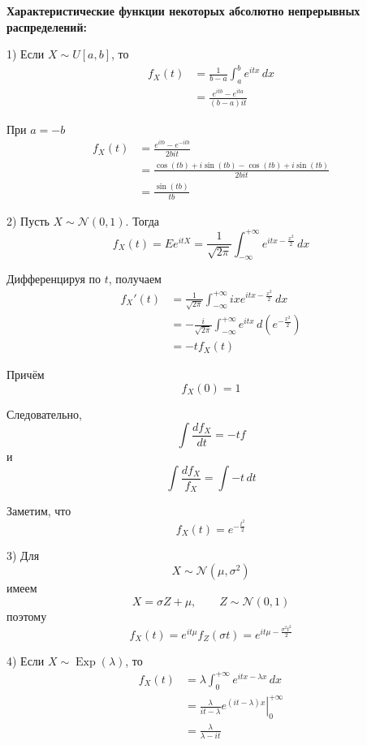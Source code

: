 \documentclass[12pt,a4paper]{article}
\begin{document}
\begin{example}

\textbf{Характеристические функции некоторых абсолютно непрерывных распределений:}

1) Если $X\sim U[a,b]$, то
\[
\begin{aligned}
f_X(t)
&=
\frac{1}{b-a}
\int_a^b e^{itx}\,dx\\
&=
\frac{e^{itb}-e^{ita}}{(b-a)it}
\end{aligned}
\]

При $a=-b$
\[
\begin{aligned}
f_X(t)
&=
\frac{e^{itb}-e^{-itb}}{2bit}\\
&=
\frac{\cos(tb)+i\sin(tb)-\cos(tb)+i\sin(tb)}{2bit}\\
&=
\frac{\sin(tb)}{tb}
\end{aligned}
\]

\bigskip

2) Пусть $X\sim\mathcal{N}(0,1)$. Тогда
\[
f_X(t)
=
Ee^{itX}
=
\frac{1}{\sqrt{2\pi}}
\int_{-\infty}^{+\infty}
e^{itx-\frac{x^2}{2}}\,dx
\]

Дифференцируя по $t$, получаем
\[
\begin{aligned}
f_X'(t)
&=
\frac{1}{\sqrt{2\pi}}
\int_{-\infty}^{+\infty}
ixe^{itx-\frac{x^2}{2}}\,dx\\
&=
-\frac{i}{\sqrt{2\pi}}
\int_{-\infty}^{+\infty}
e^{itx}\,d\left(e^{-\frac{x^2}{2}}\right)\\
&=
-tf_X(t)
\end{aligned}
\]

Причём
\[
f_X(0)=1
\]

Следовательно,
\[
\int\frac{df_X}{dt}
=
-tf
\]
и
\[
\int\frac{df_X}{f_X}
=
\int-t\,dt
\]

Заметим, что
\[
f_X(t)
=
e^{-\frac{t^2}{2}}
\]

\bigskip

3) Для
\[
X\sim\mathcal{N}(\mu,\sigma^2)
\]
имеем
\[
X=\sigma Z+\mu,
\qquad
Z\sim\mathcal{N}(0,1)
\]
поэтому
\[
f_X(t)
=
e^{it\mu}f_Z(\sigma t)
=
e^{it\mu-\frac{\sigma^2t^2}{2}}
\]

\bigskip

4) Если $X\sim\operatorname{Exp}(\lambda)$, то
\[
\begin{aligned}
f_X(t)
&=
\lambda
\int_0^{+\infty}
e^{itx-\lambda x}\,dx\\
&=
\frac{\lambda}{it-\lambda}
\left.e^{(it-\lambda)x}\right|_0^{+\infty}\\
&=
\frac{\lambda}{\lambda-it}
\end{aligned}
\]


\end{example}
\end{document}
